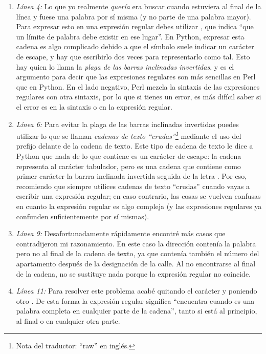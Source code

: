 \begin{enumerate}

\item \emph{Línea 4:} Lo que yo realmente \emph{quería} era buscar  cuando estuviera al final de la línea y fuese una palabra por sí misma (y no parte de una palabra mayor). Para expresar esto en una expresión regular debes utilizar , que indica ``que un límite de palabra debe existir en ese lugar''. En Python, expresar esta cadena es algo complicado debido a que el símbolo  suele indicar un carácter de escape, y hay que escribirlo dos veces para representarlo como tal. Esto hay quien lo llama la \emph{plaga de las barras inclinadas invertidas}, y es el argumento para decir que las expresiones regulares son más sencillas en Perl que en Python. En el lado negativo, Perl mezcla la sintaxis de las expresiones regulares con otra sintaxis, por lo que si tienes un error, es más difícil saber si el error es en la sintaxis o en la expresión regular.

\item \emph{Línea 6:} Para evitar la plaga de las barras inclinadas invertidas puedes utilizar lo que se llaman \emph{cadenas de texto ``crudas''\footnote{Nota del traductor: ``raw'' en inglés.}} mediante el uso del prefijo  delante de la cadena de texto. Este tipo de cadena de texto le dice a Python que nada de lo que contiene es un carácter de escape: la cadena  representa al carácter tabulador, pero  es una cadena que contiene como primer carácter la barrra inclinada invertida seguida de la letra . Por eso, recomiendo que siempre utilices cadenas de texto ``crudas'' cuando vayas a escribir una expresión regular; en caso contrario, las cosas se vuelven confusas en cuanto la expresión regular es algo compleja (y las expresiones regulares ya confunden suficientemente por sí mismas).

\item \emph{Línea 9:} Desafortunadamente rápidamente encontré más casos que contradijeron mi razonamiento. En este caso la dirección contenía la palabra  pero no al final de la cadena de texto, ya que contenía también el número del apartamento después de la designación de la calle. Al no encontrarse al final de la cadena, no se sustituye nada porque la expresión regular no coincide. 

\item \emph{Línea 11:} Para resolver este problema acabé quitando el carácter \codigo{\$} y poniendo otro . De esta forma la expresión regular significa ``encuentra  cuando es una palabra completa en cualquier parte de la cadena'', tanto si está al principio, al final o en cualquier otra parte.

\end{enumerate}

